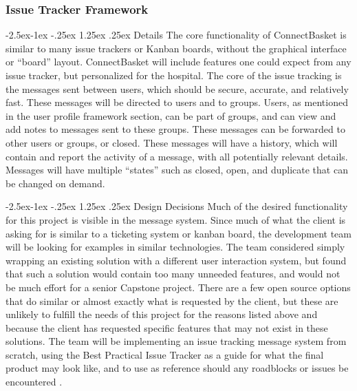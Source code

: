 \documentclass[onecolumn, draftclsnofoot,10pt, compsoc]{IEEEtran}
\makeatletter
\renewcommand\paragraph{\@startsection{paragraph}{4}{\z@}%
            {-2.5ex\@plus -1ex \@minus -.25ex}%
            {1.25ex \@plus .25ex}%
            {\normalfont\normalsize\bfseries}}
\makeatother
\begin{document}
\subsubsection{Issue Tracker Framework}

\paragraph{Details}
The core functionality of ConnectBasket is similar to many issue trackers or Kanban boards, without the graphical interface or “board” layout. ConnectBasket will include features one could expect from any issue tracker, but personalized for the hospital. The core of the issue tracking is the messages sent between users, which should be secure, accurate, and relatively fast. These messages will be directed to users and to groups. Users, as mentioned in the user profile framework section, can be part of groups, and can view and add notes to messages sent to these groups. These messages can be forwarded to other users or groups, or closed. These messages will have a history, which will contain and report the activity of a message, with all potentially relevant details. Messages will have multiple “states” such as closed, open, and duplicate that can be changed on demand.


\paragraph{Design Decisions}
Much of the desired functionality for this project is visible in the message system. Since much of what the client is asking for is similar to a ticketing system or kanban board, the development team will be looking for examples in similar technologies. The team considered simply wrapping an existing solution with a different user interaction system, but found that such a solution would contain too many unneeded features, and would not be much effort for a senior Capstone project. There are a few open source options that do similar or almost exactly what is requested by the client, but these are unlikely to fulfill the needs of this project for the reasons listed above and because the client has requested specific features that may not exist in these solutions. The team will be implementing an issue tracking message system from scratch, using the Best Practical Issue Tracker as a guide for what the final product may look like, and to use as reference should any roadblocks or issues be encountered \cite{bestpractical}.
\end{document}
